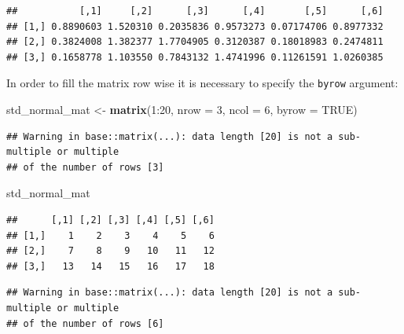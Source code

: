 \documentclass[]{article}
\newenvironment{Shaded}{}{}
\newcommand{\DataTypeTok}[1]{\textcolor[rgb]{0.56,0.13,0.00}{#1}}
\newcommand{\DecValTok}[1]{\textcolor[rgb]{0.25,0.63,0.44}{#1}}
\newcommand{\KeywordTok}[1]{\textcolor[rgb]{0.00,0.44,0.13}{\textbf{#1}}}
\newcommand{\NormalTok}[1]{#1}
\newcommand{\OperatorTok}[1]{\textcolor[rgb]{0.40,0.40,0.40}{#1}}
\newcommand{\OtherTok}[1]{\textcolor[rgb]{0.00,0.44,0.13}{#1}}
\newcommand{\StringTok}[1]{\textcolor[rgb]{0.25,0.44,0.63}{#1}}
\begin{document}
\begin{verbatim}
##           [,1]     [,2]      [,3]      [,4]       [,5]      [,6]
## [1,] 0.8890603 1.520310 0.2035836 0.9573273 0.07174706 0.8977332
## [2,] 0.3824008 1.382377 1.7704905 0.3120387 0.18018983 0.2474811
## [3,] 0.1658778 1.103550 0.7843132 1.4741996 0.11261591 1.0260385
\end{verbatim}

In order to fill the matrix row wise it is necessary to specify the
\texttt{byrow} argument:

\begin{Shaded}
\begin{Highlighting}[]
\NormalTok{std_normal_mat <-}\StringTok{ }\KeywordTok{matrix}\NormalTok{(}\DecValTok{1}\OperatorTok{:}\DecValTok{20}\NormalTok{, }\DataTypeTok{nrow =} \DecValTok{3}\NormalTok{, }\DataTypeTok{ncol =} \DecValTok{6}\NormalTok{, }\DataTypeTok{byrow =} \OtherTok{TRUE}\NormalTok{)}
\end{Highlighting}
\end{Shaded}

\begin{verbatim}
## Warning in base::matrix(...): data length [20] is not a sub-multiple or multiple
## of the number of rows [3]
\end{verbatim}

\begin{Shaded}
\begin{Highlighting}[]
\NormalTok{std_normal_mat}
\end{Highlighting}
\end{Shaded}

\begin{verbatim}
##      [,1] [,2] [,3] [,4] [,5] [,6]
## [1,]    1    2    3    4    5    6
## [2,]    7    8    9   10   11   12
## [3,]   13   14   15   16   17   18
\end{verbatim}

\begin{Shaded}
\end{Shaded}

\begin{verbatim}
## Warning in base::matrix(...): data length [20] is not a sub-multiple or multiple
## of the number of rows [6]
\end{verbatim}
\end{document}
